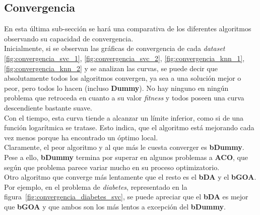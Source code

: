 \clearpage

\subsection{Convergencia}
En esta última sub-sección se hará una comparativa de los diferentes algoritmos observando su capacidad de convergencia.\\[6pt]
Inicialmente, si se observan las gráficas de convergencia de cada \textit{dataset} \ref{fig:convergencia_svc_1}, \ref{fig:convergencia_svc_2}, \ref{fig:convergencia_knn_1}, \ref{fig:convergencia_knn_2} y se analizan las curvas, se puede decir que absolutamente todos los algoritmos convergen, ya sea a una solución mejor o peor, pero todos lo hacen (incluso \textbf{Dummy}). No hay ninguno en ningún problema que retroceda en cuanto a su valor \textit{fitness} y todos poseen una curva descendiente bastante suave.\\[6pt]
Con el tiempo, esta curva tiende a alcanzar un límite inferior, como si de una función logarítmica se tratase. Esto indica, que el algoritmo está mejorando cada vez menos porque ha encontrado un óptimo local.\\[6pt]
Claramente, el peor algoritmo y al que más le cuesta converger es \textbf{bDummy}. Pese a ello, \textbf{bDummy} termina por superar en algunos problemas a \textbf{ACO}, que según que problema parece variar mucho en su proceso optimizatorio.\\[6pt]
Otro algoritmo que converge más lentamente que el resto es el \textbf{bDA} y el \textbf{bGOA}. Por ejemplo, en el problema de \textit{diabetes}, representado en la figura~\ref{fig:convergencia_diabetes_svc}, se puede apreciar que el \textbf{bDA} es mejor que \textbf{bGOA} y que ambos son los más lentos a excepción del \textbf{bDummy}.    

